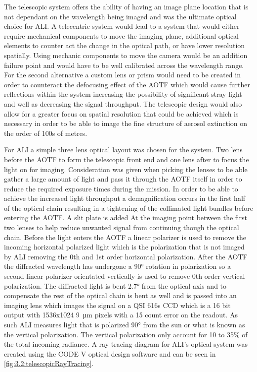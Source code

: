 \documentclass[12pt]{article}
\begin{document}
The telescopic system offers the ability of having an image plane location that is not dependant on the wavelength being imaged and was the ultimate optical choice for ALI. A telecentric system would lead to a system that would either require mechanical components to move the imaging plane, additional optical elements to counter act the change in the optical path, or have lower resolution spatially. Using mechanic components to move the camera would be an addition failure point and would have to be well calibrated across the wavelength range. For the second alternative a custom lens or prism would need to be created in order to counteract the defocusing effect of the AOTF which would cause further reflections within the system increasing the possibility of significant stray light and well as decreasing the signal throughput. The telescopic design would also allow for a greater focus on spatial resolution that could be achieved which is necessary in order to be able to image the fine structure of aerosol extinction on the order of 100s of metres.

For ALI a simple three lens optical layout was chosen for the system. Two lens before the AOTF to form the telescopic front end and one lens after to focus the light on for imaging. Consideration was given when picking the lenses to be able gather a large amount of light and pass it through the AOTF itself in order to reduce the required exposure times during the mission. In order to be able to achieve the increased light throughput a demagnification occurs in the first half of the optical chain resulting in a tightening of the collimated light bundles before entering the AOTF. A slit plate is added At the imaging point between the first two lenses to help reduce unwanted signal from continuing though the optical chain. Before the light enters the AOTF a linear polarizer is used to remove the incoming horizontal polarized light which is the polarization that is not imaged by ALI removing the 0th and 1st order horizontal polarization. After the AOTF the diffracted wavelength has undergone a 90\si{\degree} rotation in polarization so a second linear polarizer orientated vertically is used to remove 0th order vertical polarization. The diffracted light is bent 2.7\si{\degree} from the optical axis and to compensate the rest of the optical chain is bent as well and is passed into an imaging lens which images the signal on a QSI 616s CCD which is a 16 bit output with 1536x1024 9~\si{\micro\metre} pixels with a 15 count error on the readout. As such ALI measures light that is polarized 90\si{\degree} from the sun or what is known as the vertical polarization. The vertical polarization only account for 10 to 35\% of the total incoming radiance. A ray tracing diagram for ALI's optical system was created using the CODE V optical design software and can be seen in \autoref{fig:3.2:telescopicRayTracing}.
\end{document}
